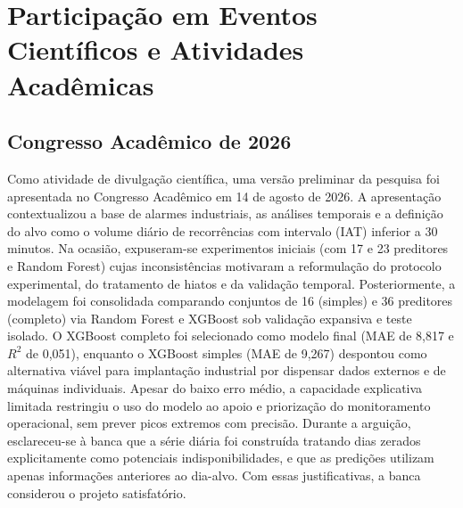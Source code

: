 \section{Participação em Eventos Científicos e Atividades Acadêmicas}
\label{sec:atividades-academicas}

\subsection{Congresso Acadêmico de 2026}

Como atividade de divulgação científica, uma versão preliminar da pesquisa foi apresentada no Congresso Acadêmico em 14 de agosto de 2026. A apresentação contextualizou a base de alarmes industriais, as análises temporais e a definição do alvo como o volume diário de recorrências com intervalo (IAT) inferior a 30 minutos. Na ocasião, expuseram-se experimentos iniciais (com 17 e 23 preditores e Random Forest) cujas inconsistências motivaram a reformulação do protocolo experimental, do tratamento de hiatos e da validação temporal.  Posteriormente, a modelagem foi consolidada comparando conjuntos de 16 (simples) e 36 preditores (completo) via Random Forest e XGBoost sob validação expansiva e teste isolado. O XGBoost completo foi selecionado como modelo final (MAE de 8,817 e $R^2$ de 0,051), enquanto o XGBoost simples (MAE de 9,267) despontou como alternativa viável para implantação industrial por dispensar dados externos e de máquinas individuais. Apesar do baixo erro médio, a capacidade explicativa limitada restringiu o uso do modelo ao apoio e priorização do monitoramento operacional, sem prever picos extremos com precisão.  Durante a arguição, esclareceu-se à banca que a série diária foi construída tratando dias zerados explicitamente como potenciais indisponibilidades, e que as predições utilizam apenas informações anteriores ao dia-alvo. Com essas justificativas, a banca considerou o projeto satisfatório.  
